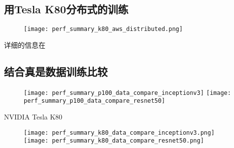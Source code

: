 \subsection{用Tesla K80分布式的训练}
\begin{figure}[H]
	\centering
	\texttt{[image: perf\_summary\_k80\_aws\_distributed.png]}
\end{figure}
详细的信息在
\subsection{结合真是数据训练比较}
\begin{figure}[H]
	\texttt{[image: perf\_summary\_p100\_data\_compare\_inceptionv3]}
	\texttt{[image: perf\_summary\_p100\_data\_compare\_resnet50]}
\end{figure}
NVIDIA Tesla K80
\begin{figure}[H]
	\centering
	\texttt{[image: perf\_summary\_k80\_data\_compare\_inceptionv3.png]}
	\texttt{[image: perf\_summary\_k80\_data\_compare\_resnet50.png]}
\end{figure}
